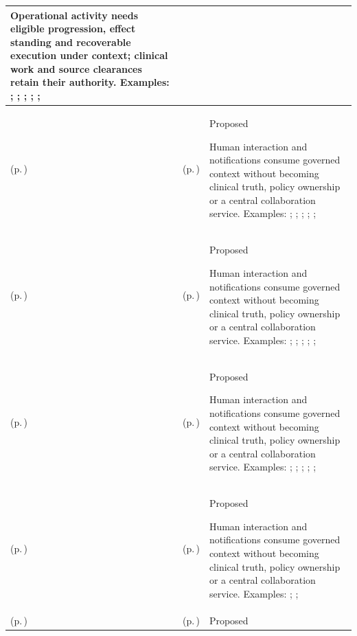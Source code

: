 \begin{longtable}{|>{\raggedright\arraybackslash}p{0.27\TableWidth}|>{\raggedright\arraybackslash}p{0.27\TableWidth}|>{\raggedright\arraybackslash}p{0.46\TableWidth}|}
Operational activity needs eligible progression, effect standing and recoverable execution under context; clinical work and source clearances retain their authority. Examples: \nameref{feature:feat-ise-20}; \nameref{feature:feat-ise-21}; \nameref{feature:feat-ise-22}; \nameref{feature:feat-ise-23}; \nameref{function:coordinate-work-order}; \nameref{service:work-order-coordination-service}\\\hline
\nameref{cap:bec-clinical-collaboration} (p.\,\pageref{cap:bec-clinical-collaboration}) & \nameref{cap:ec-11} (p.\,\pageref{cap:ec-11}) & Proposed

Human interaction and notifications consume governed context without becoming clinical truth, policy ownership or a central collaboration service. Examples: \nameref{feature:feat-ise-16}; \nameref{feature:feat-ise-17}; \nameref{feature:feat-ise-18}; \nameref{function:coordinate-care-team-collaboration}; \nameref{service:clinical-collaboration-space-service}; \nameref{function:resolve-lhr-query-within-collaboration}\\\hline
\nameref{cap:bec-clinical-collaboration} (p.\,\pageref{cap:bec-clinical-collaboration}) & \nameref{cap:ec-06} (p.\,\pageref{cap:ec-06}) & Proposed

Human interaction and notifications consume governed context without becoming clinical truth, policy ownership or a central collaboration service. Examples: \nameref{feature:feat-ise-16}; \nameref{feature:feat-ise-17}; \nameref{feature:feat-ise-18}; \nameref{function:coordinate-care-team-collaboration}; \nameref{service:clinical-collaboration-space-service}; \nameref{function:resolve-lhr-query-within-collaboration}\\\hline
\nameref{cap:bec-clinical-collaboration} (p.\,\pageref{cap:bec-clinical-collaboration}) & \nameref{cap:ec-09} (p.\,\pageref{cap:ec-09}) & Proposed

Human interaction and notifications consume governed context without becoming clinical truth, policy ownership or a central collaboration service. Examples: \nameref{feature:feat-ise-16}; \nameref{feature:feat-ise-17}; \nameref{feature:feat-ise-18}; \nameref{function:coordinate-care-team-collaboration}; \nameref{service:clinical-collaboration-space-service}; \nameref{function:resolve-lhr-query-within-collaboration}\\\hline
\nameref{cap:bec-general-collaboration} (p.\,\pageref{cap:bec-general-collaboration}) & \nameref{cap:ec-11} (p.\,\pageref{cap:ec-11}) & Proposed

Human interaction and notifications consume governed context without becoming clinical truth, policy ownership or a central collaboration service. Examples: \nameref{feature:feat-ise-19}; \nameref{function:coordinate-operational-collaboration}; \nameref{service:operational-collaboration-service}\\\hline
\nameref{cap:bec-general-collaboration} (p.\,\pageref{cap:bec-general-collaboration}) & \nameref{cap:ec-06} (p.\,\pageref{cap:ec-06}) & Proposed


\end{longtable}
